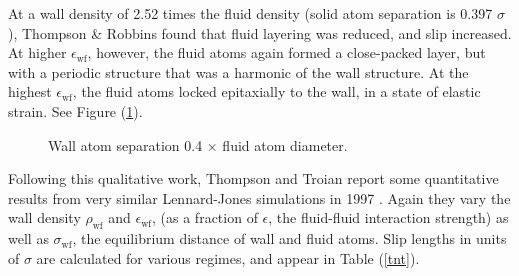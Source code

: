 \documentclass[12pt, a4paper, twoside, openright]{book}
\newcommand{\ewf}{\ensuremath{\epsilon_{\mathrm{wf}}}}
\begin{document}
At a wall density of 2.52 times the fluid density (solid atom separation is 0.397 $\sigma$), Thompson \& Robbins found that fluid layering was reduced, and slip increased. At higher \ewf, however, the fluid atoms again formed a close-packed layer, but with a periodic structure that was a harmonic of the wall structure. At the highest \ewf, the fluid atoms locked epitaxially to the wall, in a state of elastic strain.
See Figure (\ref{elastic}).

\begin{figure}[ht]
\centering
{}
\caption{Wall atom separation 0.4 $\times$ fluid atom diameter.} \label{elastic}
\end{figure}

\vspace*{1em}

\clearpage
Following this qualitative work, Thompson and Troian report some quantitative results from very similar Lennard-Jones simulations in 1997 %
 \cite{ThompsonTroian1997}. 
Again they vary the wall density $\rho_{\mathrm{wf}}$ and \ewf, (as a fraction of $\epsilon$, the fluid-fluid interaction strength) as well as $\sigma_{\mathrm{wf}}$, the equilibrium distance of wall and fluid atoms. Slip lengths in units of $\sigma$ are calculated for various regimes, and appear in Table (\ref{tnt}).
\end{document}
